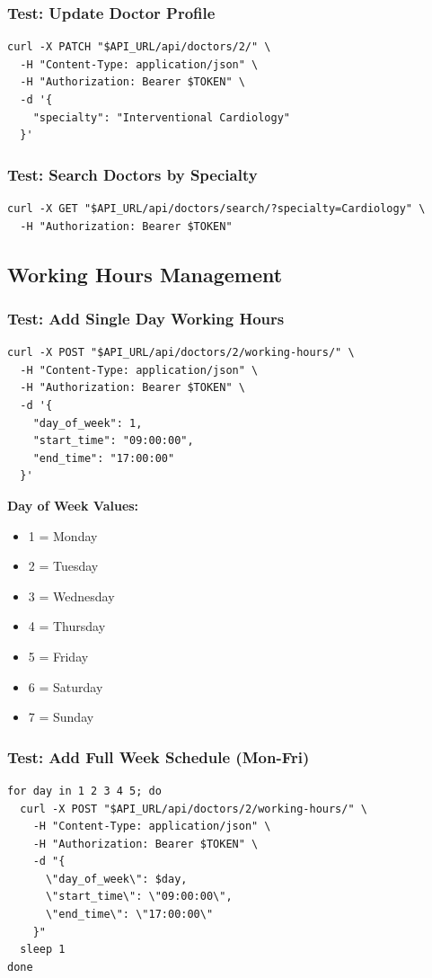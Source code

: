 \documentclass[12pt,a4paper]{article}
\begin{document}
\subsubsection{Test: Update Doctor Profile}
\begin{lstlisting}[style=bash]
curl -X PATCH "$API_URL/api/doctors/2/" \
  -H "Content-Type: application/json" \
  -H "Authorization: Bearer $TOKEN" \
  -d '{
    "specialty": "Interventional Cardiology"
  }'
\end{lstlisting}

\subsubsection{Test: Search Doctors by Specialty}
\begin{lstlisting}[style=bash]
curl -X GET "$API_URL/api/doctors/search/?specialty=Cardiology" \
  -H "Authorization: Bearer $TOKEN"
\end{lstlisting}

\subsection{Working Hours Management}

\subsubsection{Test: Add Single Day Working Hours}
\begin{lstlisting}[style=bash]
curl -X POST "$API_URL/api/doctors/2/working-hours/" \
  -H "Content-Type: application/json" \
  -H "Authorization: Bearer $TOKEN" \
  -d '{
    "day_of_week": 1,
    "start_time": "09:00:00",
    "end_time": "17:00:00"
  }'
\end{lstlisting}

\textbf{Day of Week Values:}
\begin{itemize}
    \item 1 = Monday
    \item 2 = Tuesday
    \item 3 = Wednesday
    \item 4 = Thursday
    \item 5 = Friday
    \item 6 = Saturday
    \item 7 = Sunday
\end{itemize}

\subsubsection{Test: Add Full Week Schedule (Mon-Fri)}
\begin{lstlisting}[style=bash]
for day in 1 2 3 4 5; do
  curl -X POST "$API_URL/api/doctors/2/working-hours/" \
    -H "Content-Type: application/json" \
    -H "Authorization: Bearer $TOKEN" \
    -d "{
      \"day_of_week\": $day,
      \"start_time\": \"09:00:00\",
      \"end_time\": \"17:00:00\"
    }"
  sleep 1
done
\end{lstlisting}
\end{document}
